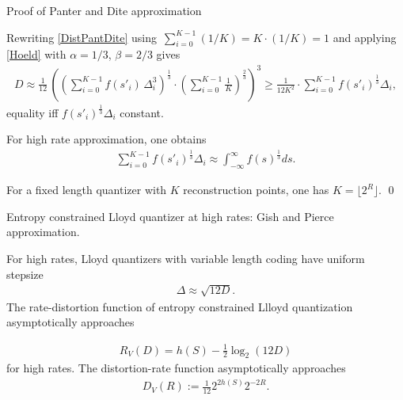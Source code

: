 \begin{frame}{Proof of Panter and Dite approximation}
\bit
\item Rewriting  \eqref{DistPantDite} using $\,\sum_{i=0}^{K-1}(1/K)=K\cdot(1/K)=1$ and applying \eqref{Hoeld} with $\alpha=1/3$, $\beta=2/3$ gives
\begin{align*}
    D \approx
      \frac{1}{12}\,\left(
         \left(
            \sum_{i=0}^{K-1} f(s'_i)\,\Delta_i^3
         \right)^{\!\frac{1}{3}}
         \cdot
         \left(
            \sum_{i=0}^{K-1} \frac{1}{K}
         \right)^{\!\frac{2}{3}}
      \right)^{\!3}
      \geq \frac{1}{12 K^2}\cdot \sum_{i=0}^{K-1}f(s'_i)^{\!\frac{1}{3}}\Delta_i,
\end{align*}
equality iff $f(s'_i)^{\!\frac{1}{3}}\Delta_i$ constant.
\item For high rate approximation, one obtains
\begin{align*}
\sum_{i=0}^{K-1}f(s'_i)^{\!\frac{1}{3}}\Delta_i\approx \int _{-\infty}^\infty f(s)^{\!\frac{1}{3}} ds. 
\end{align*}
\item For a fixed length quantizer with $K$ reconstruction points, one has $K=\lfloor 2^R\rfloor$. \qed
\eit

\end{frame}

\begin{frame}{Entropy constrained Lloyd quantizer at high rates: Gish and Pierce approximation.}
\begin{proposition}
For high rates, Lloyd quantizers with variable length coding have uniform stepsize 
\begin{align*}
\Delta\approx \sqrt{12 D}.
\end{align*} 
The rate-distortion function of entropy constrained Llloyd quantization asymptotically approaches

\begin{align*}
R_{V}(D)=h(S)-\frac{1}{2}\log_2(12 D)
\end{align*}
for high rates.
The distortion-rate function asymptotically approaches  
\begin{align*}
D_{V}(R):=\frac{1}{12}2^{2h(S)}2^{-2R}.
\end{align*}
\end{proposition}

\end{frame}


